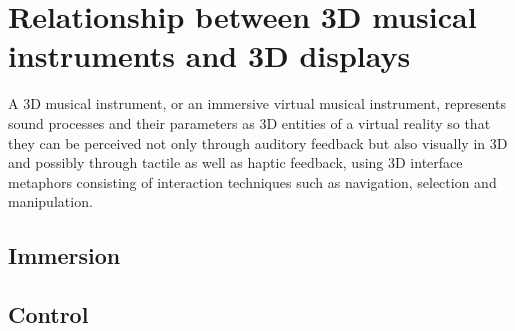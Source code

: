 \chapter{Relationship between 3D musical instruments and 3D displays}

A 3D musical instrument, or an immersive virtual musical instrument, represents sound processes and their parameters as 3D entities of a virtual reality so that they can be perceived not only through auditory feedback but also visually in 3D and possibly through tactile as well as haptic feedback, using 3D interface metaphors consisting of interaction techniques such as navigation, selection and manipulation.

\section{Immersion}


\section{Control}